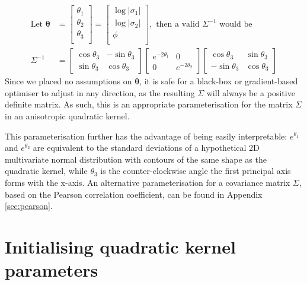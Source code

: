 \documentclass[a4paper, 12pt]{report}
\begin{document}
\begin{align}
\textrm{Let }\boldsymbol{\theta}&=\begin{bmatrix}
	\theta_1\\
	\theta_2\\
	\theta_3\\
\end{bmatrix}=\begin{bmatrix}
	\log|\sigma_1| \\
	\log|\sigma_2|\\
	\phi\\
\end{bmatrix}, \textrm{ then a valid $\Sigma^{-1}$ would be} \\
\Sigma^{-1} &= \begin{bmatrix}
	\cos \theta_3 & -\sin \theta_3 \\ \sin\theta_3 & \cos\theta_3
\end{bmatrix}\begin{bmatrix}
	 e^{-2\theta_1} & 0\\ 0 &  e^{-2\theta_2}
\end{bmatrix} \begin{bmatrix}
	\cos \theta_3 & \sin \theta_3 \\ -\sin\theta_3 & \cos\theta_3
\end{bmatrix}
\end{align}
Since we placed no assumptions on $\boldsymbol{\theta}$, it is safe for a black-box or gradient-based optimiser to adjust in any direction, as the resulting $\Sigma$ will always be a positive definite matrix. As such, this is an appropriate parameterisation for the matrix $\Sigma$ in an anisotropic quadratic kernel.

This parameterisation further has the advantage of being easily interpretable: $e^{\theta_1}$ and $e^{\theta_2}$ are equivalent to the standard deviations of a hypothetical 2D multivariate normal distribution with contours of the same shape as the quadratic kernel, while $\theta_3$ is the counter-clockwise angle the first principal axis forms with the x-axis. An alternative parameterisation for a covariance matrix $\Sigma$, based on the Pearson correlation coefficient, can be found in Appendix \ref{sec:pearson}.




\newpage
\section{Initialising quadratic kernel parameters}
\end{document}
